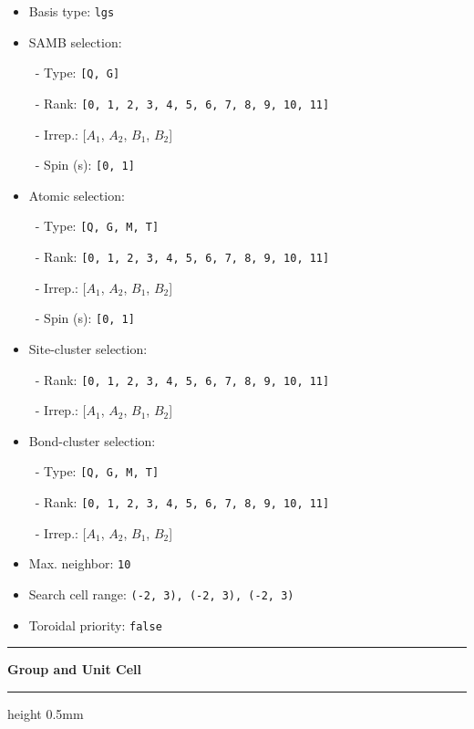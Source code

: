 \documentclass[fleqn,10pt,landscape]{jsarticle}
\begin{document}
\begin{itemize}
\item Basis type: \texttt{lgs}

\item SAMB selection:

\, - Type: \texttt{[Q, G]}

\, - Rank: \texttt{[0, 1, 2, 3, 4, 5, 6, 7, 8, 9, 10, 11]}

\, - Irrep.: [$A_{1}$, $A_{2}$, $B_{1}$, $B_{2}$]

\, - Spin (s): \texttt{[0, 1]}

\item Atomic selection:

\, - Type: \texttt{[Q, G, M, T]}

\, - Rank: \texttt{[0, 1, 2, 3, 4, 5, 6, 7, 8, 9, 10, 11]}

\, - Irrep.: [$A_{1}$, $A_{2}$, $B_{1}$, $B_{2}$]

\, - Spin (s): \texttt{[0, 1]}

\item Site-cluster selection:

\, - Rank: \texttt{[0, 1, 2, 3, 4, 5, 6, 7, 8, 9, 10, 11]}

\, - Irrep.: [$A_{1}$, $A_{2}$, $B_{1}$, $B_{2}$]

\item Bond-cluster selection:

\, - Type: \texttt{[Q, G, M, T]}

\, - Rank: \texttt{[0, 1, 2, 3, 4, 5, 6, 7, 8, 9, 10, 11]}

\, - Irrep.: [$A_{1}$, $A_{2}$, $B_{1}$, $B_{2}$]

\item Max. neighbor: \texttt{10}

\item Search cell range: \texttt{(-2, 3), (-2, 3), (-2, 3)}

\item Toroidal priority: \texttt{false}

\end{itemize}
\vspace{5mm}
\noindent \rule[0.5mm]{5mm}{0.5mm}\hspace{3mm}\textbf{Group and Unit Cell}\hspace{3mm}\leaders\hrule height 0.5mm\hfill\kern0pt
\vspace{3mm}
\end{document}
